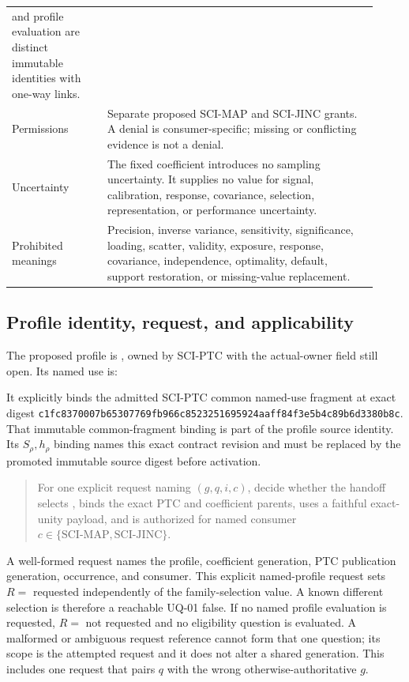 \begin{longtable}{p{0.24\linewidth}p{0.68\linewidth}}
and profile evaluation are distinct immutable identities with one-way links.\\
Permissions & Separate proposed SCI-MAP and SCI-JINC grants. A denial is
consumer-specific; missing or conflicting evidence is not a denial.\\
Uncertainty & The fixed coefficient introduces no sampling uncertainty. It
supplies no value for signal, calibration, response, covariance, selection,
representation, or performance uncertainty.\\
Prohibited meanings & Precision, inverse variance, sensitivity, significance,
loading, scatter, validity, exposure, response, covariance, independence,
optimality, default, support restoration, or missing-value replacement.\\
\bottomrule
\end{longtable}

\subsection{Profile identity, request, and applicability}

The proposed profile is \ProfileKey, owned by SCI-PTC with the actual-owner
field still open. Its named use is:

It explicitly binds the admitted SCI-PTC common named-use fragment at exact
digest
\nolinkurl{c1fc8370007b65307769fb966c8523251695924aaff84f3e5b4c89b6d3380b8c}.
That immutable common-fragment binding is part of the profile source identity.
Its \(S_\rho,h_\rho\) binding names this exact contract revision and must be
replaced by the promoted immutable source digest before activation.

\begin{quote}
For one explicit request naming \((g,q,i,c)\), decide whether the handoff
selects \FamilyKey, binds the exact PTC and coefficient parents, uses a
faithful exact-unity payload, and is authorized for named consumer
\(c\in\{\mathrm{SCI\mbox{-}MAP},\mathrm{SCI\mbox{-}JINC}\}\).
\end{quote}

A well-formed request names the profile, coefficient generation, PTC
publication generation, occurrence, and consumer. This explicit named-profile
request sets \(R=\) requested independently of the family-selection value.
A known different selection is therefore a reachable UQ-01 false. If no named
profile evaluation is requested, \(R=\) not requested and no eligibility
question is evaluated. A malformed or ambiguous request reference cannot form
that one question; its scope is the attempted request and it does not alter a
shared generation. This includes one request that pairs \(q\) with the wrong
otherwise-authoritative \(g\).

